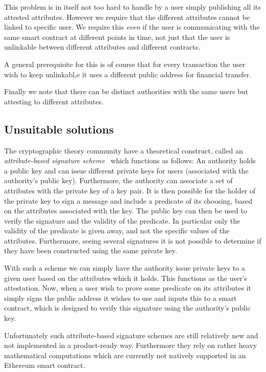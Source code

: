 \documentclass[11pt]{article} %
\begin{document}
This problem is in itself not too hard to handle by a user simply publishing all its attested attributes. However we require that the different attributes cannot be linked to specific user. We require this \emph{even} if the user is communicating with the same smart contract at different points in time, not just that the user is unlinkable between different attributes and different contracts.

A general prerequisite for this is of course that for every transaction the user wish to keep unlinkabl,e it uses a different public address for financial transfer. 

Finally we note that there can be distinct authorities with the same users but attesting to different attributes.

\subsection{Unsuitable solutions}
The cryptographic theory community have a theoretical construct, called an \emph{attribute-based signature scheme}~\cite{MPR11} which functions as follows: An authority holds a public key and can issue different private keys for users (associated with the authority's public key). Furthermore, the authority can associate a set of attributes with the private key of a key pair. It is then possible for the holder of the private key to sign a message and include a predicate of its choosing, based on the attributes associated with the key. The public key can then be used to verify the signature and the validity of the predicate. In particular only the validity of the predicate is given away, and not the specific values of the attributes. Furthermore, seeing several signatures it is not possible to determine if they have been constructed using the same private key. 

With such a scheme we can simply have the authority issue private keys to a given user based on the attributes which it holds. This functions as the user's attestation. Now, when a user wish to prove some predicate on its attributes it simply signs the public address it wishes to use and inputs this to a smart contract, which is designed to verify this signature using the authority's public key.

Unfortunately such attribute-based signature schemes are still relatively new and not implemented in a product-ready way. Furthermore they rely on rather heavy mathematical computations which are currently not natively supported in an Ethereum smart contract.
\end{document}
